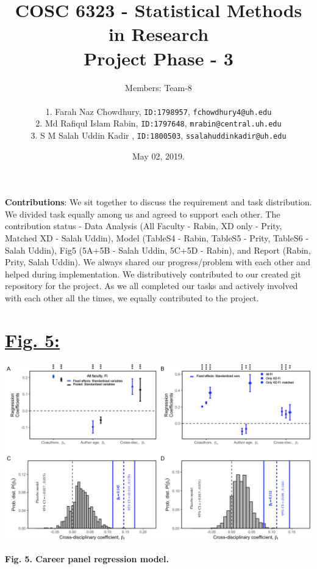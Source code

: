 \documentclass{article}\usepackage[]{graphicx}\usepackage[]{color}
\title{COSC 6323 - Statistical Methods in Research\\Project Phase - 3\\}
\author{%
    Members: Team-8 \\\\
    1. Farah Naz Chowdhury,    \texttt{ID:1798957}, \texttt{fchowdhury4@uh.edu}      \vspace{2pt} \\
    2. Md Rafiqul Islam Rabin, \texttt{ID:1797648}, \texttt{mrabin@central.uh.edu}   \vspace{2pt} \\
    3. S M Salah Uddin Kadir , \texttt{ID:1800503}, \texttt{ssalahuddinkadir@uh.edu} \vspace{2pt} \\
}
\date{May 02, 2019.}
\begin{document}
\maketitle
\par{\textbf{Contributions}: We sit together to discuss the requirement and task distribution. We divided task equally among us and agreed to support each other. The contribution status - Data Analysis (All Faculty - Rabin, XD only - Prity, Matched XD - Salah Uddin), Model (TableS4 - Rabin, TableS5 - Prity, TableS6 - Salah Uddin), Fig5 (5A+5B - Salah Uddin, 5C+5D - Rabin), and Report (Rabin, Prity, Salah Uddin). We always shared our progress/problem with each other and helped during implementation. We distributively contributed to our created git repository for the project. As we all completed our tasks and actively involved with each other all the times, we equally contributed to the project.}

\newpage
\section*{\underline{Fig. 5:}}
\begin{center}
\includegraphics[scale=0.5]{Fig5.png}
\par{\textbf{Fig. 5. Career panel regression model.}}
\end{center}
\end{document}
